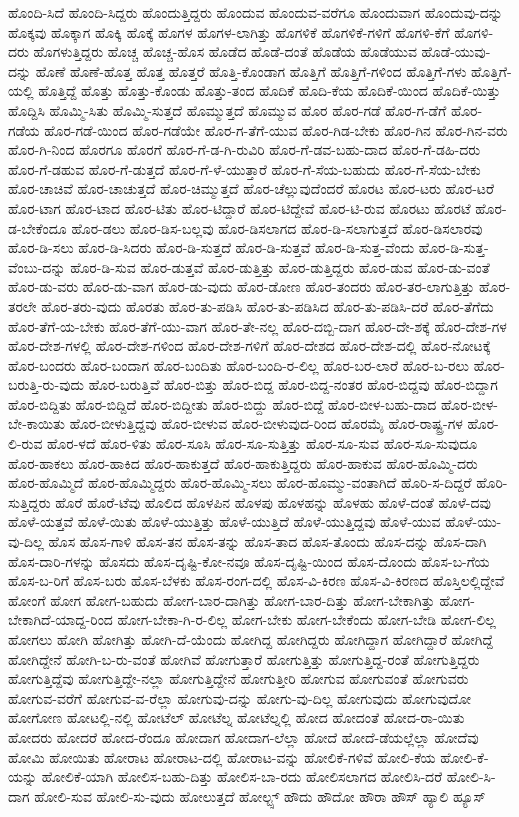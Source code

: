 {ಹೊಂದಿ-ಸಿದೆ
ಹೊಂದಿ-ಸಿದ್ದರು
ಹೊಂದುತ್ತಿದ್ದರು
ಹೊಂದುವ
ಹೊಂದುವ-ವರೆಗೂ
ಹೊಂದುವಾಗ
ಹೊಂದುವು-ದನ್ನು
ಹೊಕ್ಕವು
ಹೊಕ್ಕಾಗ
ಹೊಕ್ಕಿ
ಹೊಕ್ಕೆ
ಹೊಗಳ
ಹೊಗಳ-ಲಾಗಿತ್ತು
ಹೊಗಳಿಕೆ
ಹೊಗಳಿಕೆ-ಗಳಿಗೆ
ಹೊಗಳಿ-ಕೆಗೆ
ಹೊಗಳಿ-ದರು
ಹೊಗಳುತ್ತಿದ್ದರು
ಹೊಚ್ಚ
ಹೊಚ್ಚ-ಹೊಸ
ಹೊಡೆದ
ಹೊಡೆ-ದಂತೆ
ಹೊಡೆಯ
ಹೊಡೆಯುವ
ಹೊಡೆ-ಯುವು-ದನ್ನು
ಹೊಣೆ
ಹೊಣೆ-ಹೊತ್ತ
ಹೊತ್ತ
ಹೊತ್ತರೆ
ಹೊತ್ತಿ-ಕೊಂಡಾಗ
ಹೊತ್ತಿಗೆ
ಹೊತ್ತಿಗೆ-ಗಳಿಂದ
ಹೊತ್ತಿಗೆ-ಗಳು
ಹೊತ್ತಿಗೆ-ಯಲ್ಲಿ
ಹೊತ್ತಿದ್ದೆ
ಹೊತ್ತು
ಹೊತ್ತು-ಕೊಂಡು
ಹೊತ್ತು-ತಂದ
ಹೊದಿಕೆ
ಹೊದಿ-ಕೆಯ
ಹೊದಿಕೆ-ಯಿಂದ
ಹೊದಿಕೆ-ಯಿತ್ತು
ಹೊದ್ದಿಸಿ
ಹೊಮ್ಮಿ-ಸಿತು
ಹೊಮ್ಮಿ-ಸುತ್ತದೆ
ಹೊಮ್ಮುತ್ತದೆ
ಹೊಮ್ಮುವ
ಹೊರ
ಹೊರ-ಗಡೆ
ಹೊರ-ಗ-ಡೆಗೆ
ಹೊರ-ಗಡೆಯ
ಹೊರ-ಗಡೆ-ಯಿಂದ
ಹೊರ-ಗಡೆಯೇ
ಹೊರ-ಗ-ತೆಗೆ-ಯುವ
ಹೊರ-ಗಿಡ-ಬೇಕು
ಹೊರ-ಗಿನ
ಹೊರ-ಗಿನ-ವರು
ಹೊರ-ಗಿ-ನಿಂದ
ಹೊರಗೂ
ಹೊರಗೆ
ಹೊರ-ಗೆ-ಡ-ಗಿ-ರುವಿರಿ
ಹೊರ-ಗೆ-ಡವ-ಬಹು-ದಾದ
ಹೊರ-ಗೆ-ಡಹಿ-ದರು
ಹೊರ-ಗೆ-ಡಹುವ
ಹೊರ-ಗೆ-ಡುತ್ತದೆ
ಹೊರ-ಗೆ-ಳೆ-ಯುತ್ತಾರೆ
ಹೊರ-ಗೆ-ಸೆಯ-ಬಹುದು
ಹೊರ-ಗೆ-ಸೆಯ-ಬೇಕು
ಹೊರ-ಚಾಚಿವೆ
ಹೊರ-ಚಾಚುತ್ತದೆ
ಹೊರ-ಚಿಮ್ಮುತ್ತದೆ
ಹೊರ-ಚೆಲ್ಲುವುದೆಂದರೆ
ಹೊರಟ
ಹೊರ-ಟರು
ಹೊರ-ಟರೆ
ಹೊರ-ಟಾಗ
ಹೊರ-ಟಾದ
ಹೊರ-ಟಿತು
ಹೊರ-ಟಿದ್ದಾರೆ
ಹೊರ-ಟಿದ್ದೇವೆ
ಹೊರ-ಟಿ-ರುವ
ಹೊರಟು
ಹೊರಟೆ
ಹೊರ-ಡ-ಬೇಕೆಂದೂ
ಹೊರ-ಡಲು
ಹೊರ-ಡಿಸ-ಬಲ್ಲವು
ಹೊರ-ಡಿಸಲಾಗದ
ಹೊರ-ಡಿ-ಸಲಾಗುತ್ತದೆ
ಹೊರ-ಡಿಸಲಾರವು
ಹೊರ-ಡಿ-ಸಲು
ಹೊರ-ಡಿ-ಸಿದರು
ಹೊರ-ಡಿ-ಸುತ್ತದೆ
ಹೊರ-ಡಿ-ಸುತ್ತವೆ
ಹೊರ-ಡಿ-ಸುತ್ತ-ವೆಂದು
ಹೊರ-ಡಿ-ಸುತ್ತ-ವೆಂಬು-ದನ್ನು
ಹೊರ-ಡಿ-ಸುವ
ಹೊರ-ಡುತ್ತವೆ
ಹೊರ-ಡುತ್ತಿತ್ತು
ಹೊರ-ಡುತ್ತಿದ್ದರು
ಹೊರ-ಡುವ
ಹೊರ-ಡು-ವಂತೆ
ಹೊರ-ಡು-ವರು
ಹೊರ-ಡು-ವಾಗ
ಹೊರ-ಡು-ವುದು
ಹೊರ-ಡೋಣ
ಹೊರ-ತಂದರು
ಹೊರ-ತರ-ಲಾಗುತ್ತಿತ್ತು
ಹೊರ-ತರಲೇ
ಹೊರ-ತರು-ವುದು
ಹೊರತು
ಹೊರ-ತು-ಪಡಿಸಿ
ಹೊರ-ತು-ಪಡಿಸಿದ
ಹೊರ-ತು-ಪಡಿಸಿ-ದರೆ
ಹೊರ-ತೆಗೆದು
ಹೊರ-ತೆಗೆ-ಯ-ಬೇಕು
ಹೊರ-ತೆಗೆ-ಯು-ವಾಗ
ಹೊರ-ತೇ-ನಲ್ಲ
ಹೊರ-ದಬ್ಬಿ-ದಾಗ
ಹೊರ-ದೇ-ಶಕ್ಕೆ
ಹೊರ-ದೇಶ-ಗಳ
ಹೊರ-ದೇಶ-ಗಳಲ್ಲಿ
ಹೊರ-ದೇಶ-ಗಳಿಂದ
ಹೊರ-ದೇಶ-ಗಳಿಗೆ
ಹೊರ-ದೇಶದ
ಹೊರ-ದೇಶ-ದಲ್ಲಿ
ಹೊರ-ನೋಟಕ್ಕೆ
ಹೊರ-ಬಂದರು
ಹೊರ-ಬಂದಾಗ
ಹೊರ-ಬಂದಿತು
ಹೊರ-ಬಂದಿ-ರ-ಲಿಲ್ಲ
ಹೊರ-ಬರ-ಲಾರೆ
ಹೊರ-ಬ-ರಲು
ಹೊರ-ಬರುತ್ತಿ-ರು-ವುದು
ಹೊರ-ಬರುತ್ತಿವೆ
ಹೊರ-ಬಿತ್ತು
ಹೊರ-ಬಿದ್ದ
ಹೊರ-ಬಿದ್ದ-ನಂತರ
ಹೊರ-ಬಿದ್ದವು
ಹೊರ-ಬಿದ್ದಾಗ
ಹೊರ-ಬಿದ್ದಿತು
ಹೊರ-ಬಿದ್ದಿದೆ
ಹೊರ-ಬಿದ್ದೀತು
ಹೊರ-ಬಿದ್ದು
ಹೊರ-ಬಿದ್ದೆ
ಹೊರ-ಬೀಳ-ಬಹು-ದಾದ
ಹೊರ-ಬೀಳ-ಬೇ-ಕಾಯಿತು
ಹೊರ-ಬೀಳುತ್ತಿದ್ದವು
ಹೊರ-ಬೀಳುವ
ಹೊರ-ಬೀಳುವುದ-ರಿಂದ
ಹೊರಮೈ
ಹೊರ-ರಾಷ್ಟ್ರ-ಗಳ
ಹೊರ-ಲಿ-ರುವ
ಹೊರ-ಳದೆ
ಹೊರ-ಳಿತು
ಹೊರ-ಸೂಸಿ
ಹೊರ-ಸೂ-ಸುತ್ತಿತ್ತು
ಹೊರ-ಸೂ-ಸುವ
ಹೊರ-ಸೂ-ಸುವುದೂ
ಹೊರ-ಹಾಕಲು
ಹೊರ-ಹಾಕಿದ
ಹೊರ-ಹಾಕುತ್ತದೆ
ಹೊರ-ಹಾಕುತ್ತಿದ್ದರು
ಹೊರ-ಹಾಕುವ
ಹೊರ-ಹೊಮ್ಮಿ-ದರು
ಹೊರ-ಹೊಮ್ಮಿದೆ
ಹೊರ-ಹೊಮ್ಮಿದ್ದರು
ಹೊರ-ಹೊಮ್ಮಿ-ಸಲು
ಹೊರ-ಹೊಮ್ಮು-ವಂತಾಗಿದೆ
ಹೊರಿ-ಸ-ದಿದ್ದರೆ
ಹೊರಿ-ಸುತ್ತಿದ್ದರು
ಹೊರೆ
ಹೊರೆ-ಟೆವು
ಹೊಲಿದ
ಹೊಳಪಿನ
ಹೊಳಪು
ಹೊಳಹನ್ನು
ಹೊಳಹು
ಹೊಳೆ-ದಂತೆ
ಹೊಳೆ-ದವು
ಹೊಳೆ-ಯತ್ತವೆ
ಹೊಳೆ-ಯಿತು
ಹೊಳೆ-ಯುತ್ತಿತ್ತು
ಹೊಳೆ-ಯುತ್ತಿದೆ
ಹೊಳೆ-ಯುತ್ತಿದ್ದವು
ಹೊಳೆ-ಯುವ
ಹೊಳೆ-ಯು-ವು-ದಿಲ್ಲ
ಹೊಸ
ಹೊಸ-ಗಾಳಿ
ಹೊಸ-ತನ
ಹೊಸ-ತನ್ನು
ಹೊಸ-ತಾದ
ಹೊಸ-ತೊಂದು
ಹೊಸ-ದನ್ನು
ಹೊಸ-ದಾಗಿ
ಹೊಸ-ದಾರಿ-ಗಳನ್ನು
ಹೊಸದು
ಹೊಸ-ದೃಷ್ಟಿ-ಕೋ-ನವೂ
ಹೊಸ-ದೃಷ್ಟಿ-ಯಿಂದ
ಹೊಸ-ದೊಂದು
ಹೊಸ-ಬ-ಗೆಯ
ಹೊಸ-ಬ-ರಿಗೆ
ಹೊಸ-ಬರು
ಹೊಸ-ಬೆಳಕು
ಹೊಸ-ರಂಗ-ದಲ್ಲಿ
ಹೊಸ-ವಿ-ಕಿರಣ
ಹೊಸ-ವಿ-ಕಿರಣದ
ಹೊಸ್ತಿಲಲ್ಲಿದ್ದೇವೆ
ಹೋಂಗೆ
ಹೋಗ
ಹೋಗ-ಬಹುದು
ಹೋಗ-ಬಾರ-ದಾಗಿತ್ತು
ಹೋಗ-ಬಾರ-ದಿತ್ತು
ಹೋಗ-ಬೇಕಾಗಿತ್ತು
ಹೋಗ-ಬೇಕಾಗಿದೆ-ಯಾದ್ದ-ರಿಂದ
ಹೋಗ-ಬೇಕಾ-ಗಿ-ರ-ಲಿಲ್ಲ
ಹೋಗ-ಬೇಕು
ಹೋಗ-ಬೇಕೆಂದು
ಹೋಗ-ಬೇಡಿ
ಹೋಗ-ಲಿಲ್ಲ
ಹೋಗಲು
ಹೋಗಿ
ಹೋಗಿತ್ತು
ಹೋಗಿ-ದೆ-ಯೆಂದು
ಹೋಗಿದ್ದ
ಹೋಗಿದ್ದರು
ಹೋಗಿದ್ದಾಗ
ಹೋಗಿದ್ದಾರೆ
ಹೋಗಿದ್ದೆ
ಹೋಗಿದ್ದೇನೆ
ಹೋಗಿ-ಬ-ರು-ವಂತೆ
ಹೋಗಿವೆ
ಹೋಗುತ್ತಾರೆ
ಹೋಗುತ್ತಿತ್ತು
ಹೋಗುತ್ತಿದ್ದ-ರಂತೆ
ಹೋಗುತ್ತಿದ್ದರು
ಹೋಗುತ್ತಿದ್ದೆವು
ಹೋಗುತ್ತಿದ್ದೇ-ನಲ್ಲಾ
ಹೋಗುತ್ತಿದ್ದೇನೆ
ಹೋಗುತ್ತೀರಿ
ಹೋಗುವ
ಹೋಗುವಂತೆ
ಹೋಗುವರು
ಹೋಗುವ-ವರೆಗೆ
ಹೋಗುವ-ವ-ರೆಲ್ಲಾ
ಹೋಗುವು-ದನ್ನು
ಹೋಗು-ವು-ದಿಲ್ಲ
ಹೋಗುವುದು
ಹೋಗುವುದೋ
ಹೋಗೋಣ
ಹೋಟಲ್ಲಿ-ನಲ್ಲಿ
ಹೋಟೆಲ್
ಹೋಟೆಲ್ನ
ಹೋಟೆಲ್ನಲ್ಲಿ
ಹೋದ
ಹೋದಂತೆ
ಹೋದ-ರಾ-ಯಿತು
ಹೋದರು
ಹೋದರೆ
ಹೋದ-ರೆಂದೂ
ಹೋದಾಗ
ಹೋದಾಗ-ಲೆಲ್ಲಾ
ಹೋದೆ
ಹೋದೆ-ಡೆಯಲ್ಲೆಲ್ಲಾ
ಹೋದೆವು
ಹೋಮಿ
ಹೋಯಿತು
ಹೋರಾಟ
ಹೋರಾಟ-ದಲ್ಲಿ
ಹೋರಾಟ-ವನ್ನು
ಹೋಲಿಕೆ-ಗಳಿವೆ
ಹೋಲಿ-ಕೆಯ
ಹೋಲಿ-ಕೆ-ಯನ್ನು
ಹೋಲಿಕೆ-ಯಾಗಿ
ಹೋಲಿಸ-ಬಹು-ದಿತ್ತು
ಹೋಲಿಸ-ಬಾ-ರದು
ಹೋಲಿಸಲಾಗದ
ಹೋಲಿಸಿ-ದರೆ
ಹೋಲಿ-ಸಿ-ದಾಗ
ಹೋಲಿ-ಸುವ
ಹೋಲಿ-ಸು-ವುದು
ಹೋಲುತ್ತದೆ
ಹೋಲ್ಟ್ಸ್
ಹೌದು
ಹೌದೋ
ಹೌರಾ
ಹೌಸ್
ಹ್ಯಾಲಿ
ಹ್ಯೂಸ್
}
